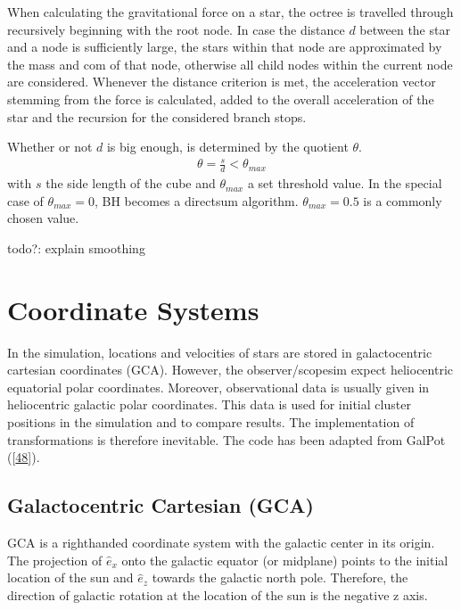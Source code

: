 \documentclass[letterpaper,10pt,english]{sphinxmanual}
\begin{document}
\sphinxAtStartPar
When calculating the gravitational force on a star, the octree is travelled through recursively beginning with the root node.
In case the distance \(d\) between the star and a node is sufficiently large, the stars within that node are approximated by the mass and com of that node,
otherwise all child nodes within the current node are considered. Whenever the distance criterion is met,
the acceleration vector stemming from the force is calculated, added to the overall acceleration of the star and the recursion for the considered branch stops.

\sphinxAtStartPar
Whether or not \(d\) is big enough, is determined by the quotient \(\theta\).
\begin{equation*}
\begin{split}\theta = \frac{s}{d} < \theta_{max}\end{split}
\end{equation*}
\sphinxAtStartPar
with \(s\) the side length of the cube and \(\theta_{max}\) a set threshold value.
In the special case of \(\theta_{max}=0\), BH becomes a direct\sphinxhyphen{}sum algorithm. \(\theta_{max}=0.5\) is a commonly chosen value.

\sphinxAtStartPar
todo?: explain smoothing


\chapter{Coordinate Systems}
\label{\detokenize{NBodySimulation/CoordinateSystems:coordinate-systems}}\label{\detokenize{NBodySimulation/CoordinateSystems::doc}}
\sphinxAtStartPar
In the simulation, locations and velocities of stars are stored in galactocentric cartesian coordinates (GCA).
However, the observer/scopesim expect heliocentric equatorial polar coordinates.
Moreover, observational data is usually given in heliocentric galactic polar coordinates.
This data is used for initial cluster positions in the simulation and to compare results.
The implementation of transformations is therefore inevitable. The code has been adapted from GalPot ({[}\hyperlink{cite.NBodySimulation/Appendix:id23}{48}{]}).


\section{Galactocentric Cartesian (GCA)}
\label{\detokenize{NBodySimulation/CoordinateSystems:galactocentric-cartesian-gca}}
\sphinxAtStartPar
GCA is a right\sphinxhyphen{}handed coordinate system with the galactic center in its origin.
The projection of \(\hat{e}_x\) onto the galactic equator (or midplane) points to the initial location of the sun and
\(\hat{e}_z\) towards the galactic north pole. Therefore, the direction of galactic rotation at the location of the sun is the negative z axis.
\end{document}
